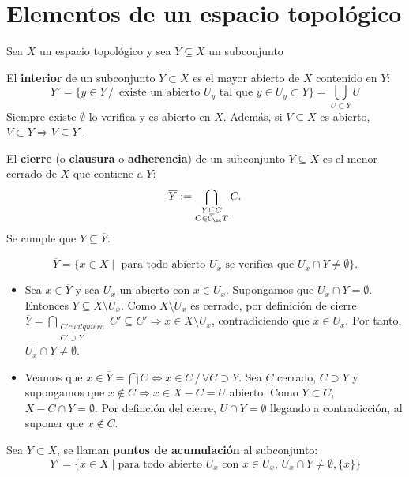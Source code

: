 \section{Elementos de un espacio topol\'ogico}
Sea $X$ un espacio topol\'ogico y sea $Y\subseteq X$ un subconjunto
\begin{defi} El \textbf{interior} de un subconjunto $Y\subset X$ es el mayor abierto de $X$ contenido en $Y$:
    $$Y^{\circ} = \{y\in Y \, / \, \text{ existe un abierto } U_y \text{ tal que } y\in U_y \subset Y\} = \bigcup_{U\subset Y} U$$
    Siempre existe $\emptyset$ lo verifica y es abierto en $X$. Adem\'as, si $V \subseteq X$ es abierto, $V\subset Y \Rightarrow V \subseteq Y^{\circ}$.
\end{defi}
\begin{defi}
El \textbf{cierre} (o \textbf{clausura} o \textbf{adherencia}) de un subconjunto $Y \subseteq X$ es el menor cerrado de $X$ que contiene a $Y$:
\[
    \overline{Y} := \bigcap_{\substack{Y \subseteq C \\ C \in \mathcal{C}_\mc T}} C.
\]
Se cumple que $Y \subseteq \overline{Y}$. 
\end{defi}
\begin{prop}
\[
    \overline{Y} = \{x \in X \mid \text{ para todo abierto } U_x \text{ se verifica que } U_x \cap Y \ne \emptyset\}.
\]
\end{prop}
\begin{dem}
\begin{itemize}
    \item[($\subseteq$)] Sea $x \in \overline{Y}$ y sea $U_x$ un abierto con $x \in U_x$. Supongamos que $U_x \cap Y = \emptyset$. Entonces $Y \subseteq X \setminus U_x$. Como $X \setminus U_x$ es cerrado, por definición de cierre $\displaystyle \overline{Y} = \bigcap_{\substack{C' cualquiera \\ C' \supset Y}} C ' \subseteq C' \Rightarrow x \in X \setminus U_x$, contradiciendo que $x \in U_x$. Por tanto, $U_x \cap Y \ne \emptyset$.
    \item[($\supseteq$)] Veamos que $x\in \overline Y = \bigcap C \iff x\in C \, / \, \forall C \supset Y$. Sea $C$ cerrado, $C\supset Y$ y supongamos que $x\nin C \Rightarrow x \in X-C = U$ abierto. Como $Y\subset C$, $X-C \cap Y=\emptyset$. Por definci\'on del cierre, $U\cap Y = \emptyset$ llegando a contradicci\'on, al suponer que $x\nin C$.
\end{itemize}
\end{dem}
\begin{defi}
    Sea $Y\subset X$, se llaman \textbf{puntos de acumulación} al subconjunto:
    $$Y' = \{x\in X \mid \text{para todo abierto } U_x \text{ con } x\in U_x, \, U_x \cap Y \neq \emptyset, \{x\}\}$$

\end{defi}
